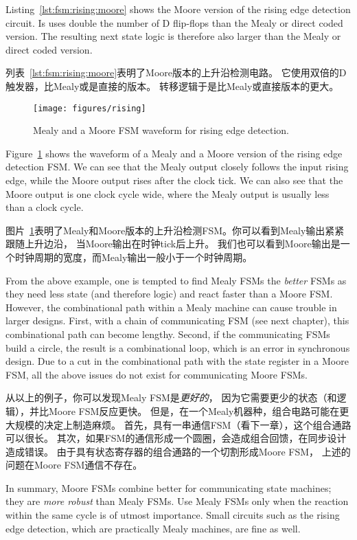 \documentclass[%
    10pt,
    headinclude, footexclude,
    openright, %
    notitlepage,
    cleardoubleempty,
    headsepline,
    pointlessnumbers,
    bibtotoc, idxtotoc,
    ]{scrbook}
\begin{document}
Listing~\ref{lst:fsm:rising:moore} shows the Moore version of the rising edge detection
circuit. Is uses double the number of D flip-flops than the Mealy or direct
coded version. The resulting next state logic is therefore also larger
than the Mealy or direct coded version.

列表~\ref{lst:fsm:rising:moore}表明了Moore版本的上升沿检测电路。
它使用双倍的D触发器，比Mealy或是直接的版本。
转移逻辑于是比Mealy或直接版本的更大。

\begin{figure}
  \centering
  \texttt{[image: figures/rising]}
  \caption{Mealy and a  Moore FSM waveform for rising edge detection.}
  \label{fig:rising}
\end{figure}

Figure~\ref{fig:rising} shows the waveform of a Mealy and a  Moore version
of the rising edge detection FSM. We can see that the Mealy output closely
follows the input rising edge, while the Moore output rises after the clock tick.
We can also see that the Moore output is one clock cycle wide, where the Mealy
output is usually less than a clock cycle.

图片~\ref{fig:rising}表明了Mealy和Moore版本的上升沿检测FSM。你可以看到Mealy输出紧紧跟随上升边沿，
当Moore输出在时钟tick后上升。
我们也可以看到Moore输出是一个时钟周期的宽度，而Mealy输出一般小于一个时钟周期。

From the above example, one is tempted to find Mealy FSMs the \emph{better}
FSMs as they need less state (and therefore logic) and react faster than a Moore FSM.
However, the combinational path within a Mealy machine can cause trouble in
larger designs. First, with a chain of communicating FSM (see next chapter), this
combinational path can become lengthy. Second, if the communicating FSMs build
a circle, the result is a combinational loop, which is an error in synchronous design.
Due to a cut in the combinational path with the state register in a Moore FSM,
all the above issues do not exist for communicating Moore FSMs.

从以上的例子，你可以发现Mealy FSM是\emph{更好的}，
因为它需要更少的状态（和逻辑），并比Moore FSM反应更快。
但是，在一个Mealy机器种，组合电路可能在更大规模的决定上制造麻烦。
首先，具有一串通信FSM（看下一章），这个组合通路可以很长。
其次，如果FSM的通信形成一个圆圈，会造成组合回馈，在同步设计造成错误。
由于具有状态寄存器的组合通路的一个切割形成Moore FSM，
上述的问题在Moore FSM通信不存在。

In summary, Moore FSMs combine better for communicating state machines; they
are \emph{more robust} than Mealy FSMs. Use Mealy FSMs only when the reaction within the same
cycle is of utmost importance. Small circuits such as the rising edge detection,
which are practically Mealy machines, are fine as well.
\end{document}
